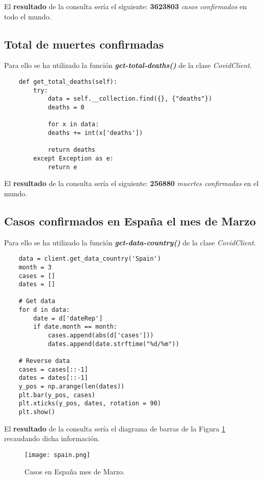\documentclass[11pt]{diazessay} %
\begin{document}
El \textbf{resultado} de la consulta sería el siguiente: \textbf{3623803} \textit{casos confirmados} en todo el mundo.


\subsection*{Total de muertes confirmadas}
Para ello se ha utilizado la función \textit{\textbf{get-total-deaths()}} \cite{jupyter} de la clase \textit{CovidClient}.

\lstset{language=Python}
\begin{lstlisting}
	def get_total_deaths(self):
		try:
			data = self.__collection.find({}, {"deaths"})
			deaths = 0
	
			for x in data:
			deaths += int(x['deaths'])
			
			return deaths
		except Exception as e:
			return e
\end{lstlisting}

El \textbf{resultado} de la consulta sería el siguiente: \textbf{256880} \textit{muertes confirmadas} en el mundo.


\newpage
\subsection*{Casos confirmados en España el mes de Marzo}
Para ello se ha utilizado la función \textit{\textbf{get-data-country()}} \cite{jupyter} de la clase \textit{CovidClient}.

\lstset{language=Python}
\begin{lstlisting}
	data = client.get_data_country('Spain')
	month = 3
	cases = []
	dates = []
	
	# Get data
	for d in data:
		date = d['dateRep']
		if date.month == month:
			cases.append(abs(d['cases']))
			dates.append(date.strftime("%d/%m"))
	
	# Reverse data
	cases = cases[::-1]
	dates = dates[::-1]
	y_pos = np.arange(len(dates))
	plt.bar(y_pos, cases)
	plt.xticks(y_pos, dates, rotation = 90)
	plt.show()
\end{lstlisting}

El \textbf{resultado} de la consulta sería el diagrama de barras de la Figura \ref{fig:spain-march} recaudando dicha información.

\begin{figure}[h!]
	\centering
	\texttt{[image: spain.png]}
	\caption{Casos en España mes de Marzo. \cite{jupyter}}
	\label{fig:spain-march}
\end{figure}
\end{document}
